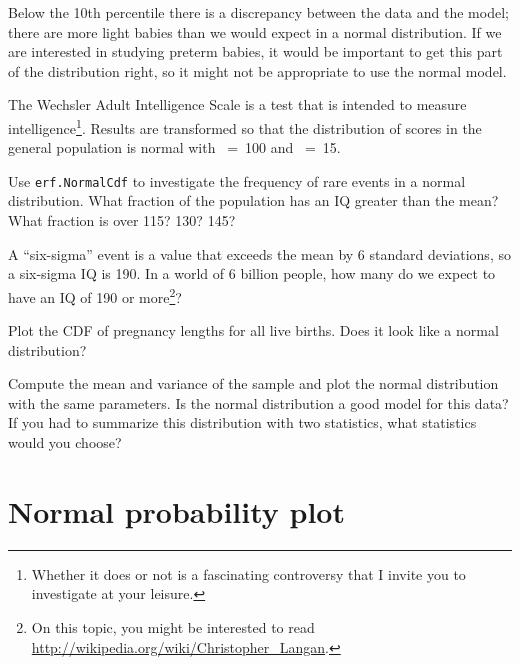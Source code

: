 \documentclass[12pt]{book}
\begin{document}
Below the 10th percentile there is a discrepancy between the data
and the model; there are more light babies than we would expect in
a normal distribution.  If we are interested in studying preterm
babies, it would be important to get this part of the distribution
right, so it might not be appropriate to use the normal
model.

\begin{exercise}
The Wechsler Adult Intelligence Scale is a test that is intended
to measure intelligence\footnote{Whether it does or not is a
fascinating controversy that I invite you to investigate at your
leisure.}.  Results are transformed so that the distribution of scores
in the general population is normal with \mymu~=~100 and \mysigma~=~15.

Use {\tt erf.NormalCdf} to investigate the frequency of rare events in
a normal distribution.  What fraction of the population has an IQ
greater than the mean?  What fraction is over 115?  130?  145?

A ``six-sigma'' event is a value that exceeds the mean by 6 standard
deviations, so a six-sigma IQ is 190.  In a world of 6 billion people,
how many do we expect to have an IQ of 190 or more\footnote{On this
  topic, you might be interested to read
  \url{http://wikipedia.org/wiki/Christopher_Langan}.}?

\end{exercise}


\begin{exercise}
Plot the CDF of pregnancy lengths for all live births.  Does it
look like a normal distribution?

Compute the mean and variance of the sample and plot the normal
distribution with the same parameters.  Is the normal distribution a
good model for this data?  If you had to summarize this distribution
with two statistics, what statistics would you choose?

\end{exercise}


\section{Normal probability plot}
\end{document}

